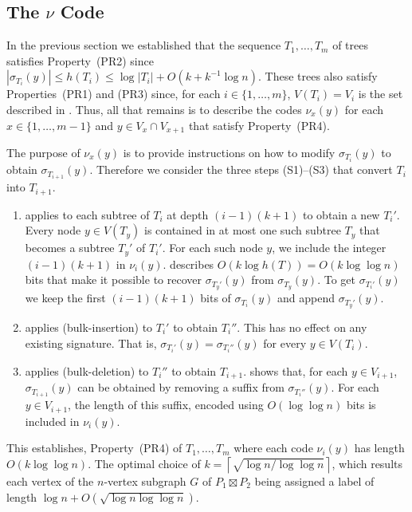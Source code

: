 \documentclass[kpfonts]{patmorin}
\begin{document}
\subsection{The $\nu$ Code}

In the previous section we established that the sequence $T_1,\ldots,T_m$ of trees satisfies Property~(PR2) since $|\sigma_{T_i}(y)|\le h(T_i)\le \log |T_i|+O(k+k^{-1}\log n)$.  These trees also satisfy Properties~(PR1) and (PR3) since, for each $i\in\{1,\ldots,m\}$, $V(T_i)=V_i$ is the set described in .  Thus, all that remains is to describe the codes $\nu_x(y)$ for each $x\in\{1,\ldots,m-1\}$ and $y\in V_x\cap V_{x+1}$ that satisfy Property~(PR4).

The purpose of $\nu_x(y)$ is to provide instructions on how to modify $\sigma_{T_i}(y)$ to obtain $\sigma_{T_{i+1}}(y)$.  Therefore we consider the three steps (S1)--(S3) that convert $T_i$ into $T_{i+1}$.  
\begin{enumerate}[(S1)]
  \item applies  to each subtree of $T_i$ at depth $(i-1)(k+1)$ to obtain a new $T_i'$.  Every node $y\in V(T_y)$ is contained in at most one such subtree $T_y$ that becomes a subtree $T_y'$ of $T_i'$.  For each such node $y$, we include the integer $(i-1)(k+1)$ in $\nu_i(y)$.  describes $O(k\log h(T))=O(k\log\log n)$ bits that make it possible to recover $\sigma_{T_y'}(y)$ from $\sigma_{T_y}(y)$.  To get $\sigma_{T_i'}(y)$ we keep the first $(i-1)(k+1)$ bits of $\sigma_{T_i}(y)$ and append $\sigma_{T_y'}(y)$.
  
  \item applies  (bulk-insertion) to $T_{i}'$ to obtain $T_{i}''$.  This has no effect on any existing signature.  That is, $\sigma_{T_i'}(y)=\sigma_{T_{i}''}(y)$ for every $y\in V(T_i)$.
  
  \item applies  (bulk-deletion) to $T_{i}''$ to obtain $T_{i+1}$.  shows that, for each $y\in V_{i+1}$, $\sigma_{T_{i+1}}(y)$ can be obtained by removing a suffix from $\sigma_{T_i''}(y)$.  For each $y\in V_{i+1}$, the length of this suffix, encoded using $O(\log\log n)$ bits is included in $\nu_{i}(y)$.
\end{enumerate}

This establishes, Property~(PR4) of $T_1,\ldots,T_m$ where each code $\nu_i(y)$ has length $O(k\log\log n)$. The optimal choice of $k=\left\lceil\sqrt{\log n/\log\log n}\right\rceil$, which results each vertex of the $n$-vertex subgraph $G$ of $P_1\boxtimes P_2$ being assigned a label of length $\log n + O(\sqrt{\log n\log\log n})$.
\end{document}
